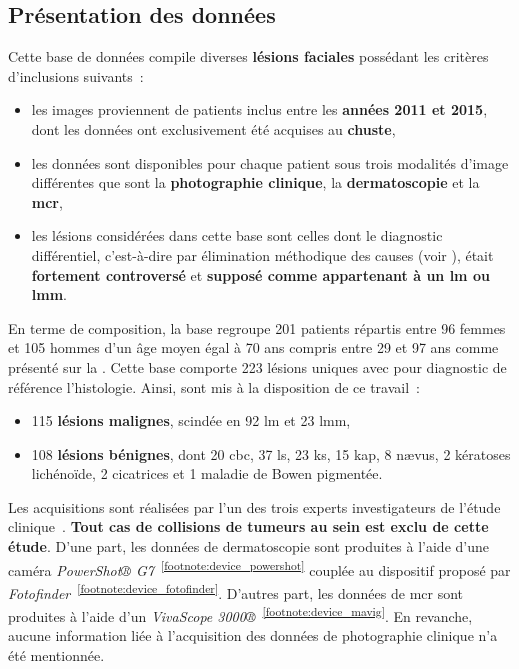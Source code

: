 \subsection{Présentation des données}
\label{sec:dataset_introduction}
Cette base de données compile diverses \textbf{lésions faciales} possédant les critères d'inclusions suivants~:
\begin{itemize}
    \item les images proviennent de patients inclus entre les \textbf{années 2011 et 2015}, dont les données ont exclusivement été acquises au \textbf{\gls{chuste}},
    \item les données sont disponibles pour chaque patient sous trois modalités d'image différentes que sont la \textbf{photographie clinique}, la \textbf{dermatoscopie} et la \textbf{\gls{mcr}},
    \item les lésions considérées dans cette base sont celles dont le diagnostic différentiel, c’est-à-dire par élimination méthodique des causes (voir ), était \textbf{fortement controversé} et \textbf{supposé comme appartenant à un \gls{lm} ou \gls{lmm}}.
\end{itemize}\par

En terme de composition, la base regroupe 201 patients répartis entre 96 femmes et 105 hommes d'un âge moyen égal à 70 ans compris entre 29 et 97 ans comme présenté sur la . Cette base comporte 223 lésions uniques avec pour diagnostic de référence l'histologie. Ainsi, sont mis à la disposition de ce travail~:
\begin{itemize}
    \item 115 \textbf{lésions malignes}, scindée en 92 \gls{lm} et 23 \gls{lmm},
    \item 108 \textbf{lésions bénignes}, dont 20 \gls{cbc}, 37 \gls{ls}, 23 \gls{ks}, 15 \gls{kap}, 8 nævus, 2 kératoses lichénoïde, 2 cicatrices et 1 maladie de Bowen pigmentée.
\end{itemize}\par

Les acquisitions sont réalisées par l'un des trois experts investigateurs de l'étude clinique~\cite{Cinotti2018}. \textbf{Tout cas de collisions de tumeurs au sein est exclu de cette étude}. D'une part, les données de dermatoscopie sont produites à l'aide d'une caméra \textit{PowerShot® G7}~\textsuperscript{\ref{footnote:device_powershot}} couplée au dispositif proposé par \textit{Fotofinder}~\textsuperscript{\ref{footnote:device_fotofinder}}. D'autres part, les données de \gls{mcr} sont produites à l'aide d'un \textit{VivaScope 3000®}~\textsuperscript{\ref{footnote:device_mavig}}. En revanche, aucune information liée à l'acquisition des données de photographie clinique n'a été mentionnée.\par

